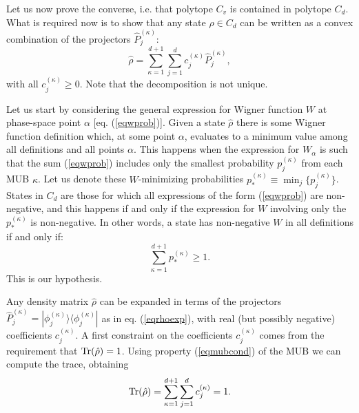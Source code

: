 \documentclass[aps,twocolumn,showpacs,nofootinbib,superscriptaddress]{revtex4}
\newcommand{\ket}[1]{|{#1}\rangle}
\newcommand{\bra}[1]{\langle{#1}|}
\begin{document}
Let us now prove the converse, i.e. that polytope $C_v$ is contained in polytope $C_d$. What is required now is to show that any state $\hat{\rho} \in C_d$ can be written as a convex combination of the projectors $\hat{P}_{j}^{(\kappa)}$:
\begin{equation}
\hat{\rho}=\sum_{\kappa=1}^{d+1} \sum_{j=1}^d
c_{j}^{(\kappa)}\hat{P}_{j}^{(\kappa)},\label{eqrhoexp}
\end{equation}
with all $c_{j}^{(\kappa)}\ge0$. Note that the decomposition is
not unique.

Let us start by considering the general expression for Wigner
function $W$ at phase-space point $\alpha$ [eq. (\ref{eqwprob})].
Given a state $\hat{\rho}$ there is some Wigner function
definition which, at some point $\alpha$, evaluates to a minimum
value among all definitions and all points $\alpha$. This happens
when the expression for $W_{\alpha}$ is such that the sum
(\ref{eqwprob}) includes only the smallest probability
$p_{j}^{(\kappa)}$ from each MUB $\kappa$. Let us denote these
$W$-minimizing probabilities $p_{*}^{(\kappa)}\equiv
\min_j\{p_{j}^{(\kappa)}\}$. States in $C_d$ are those for which
all expressions of the form (\ref{eqwprob}) are non-negative, and
this happens if and only if the expression for $W$ involving only
the $p_{*}^{(\kappa)}$ is non-negative. In other words, a state
has non-negative $W$ in all definitions if and only if:
\begin{equation}
\sum_{\kappa=1}^{d+1}p_{*}^{(\kappa)}\ge 1.
\end{equation}
This is our hypothesis.

Any density matrix $\hat{\rho}$ can be expanded in terms of the projectors
$\hat{P}_{j}^{(\kappa)}=\ket{\phi_{j}^{(\kappa)}} \bra{\phi_{j}^{(\kappa)}}$ as in eq.
(\ref{eqrhoexp}), with real (but possibly negative) coefficients
$c_{j}^{(\kappa)}$. A first constraint on the coefficients
$c_{j}^{(\kappa)}$ comes from the requirement that
${\rm Tr}(\hat{\rho})=1$. Using property (\ref{eqmubcond}) of the MUB we
can compute the trace, obtaining
\begin{equation}
{\rm Tr}(\hat{\rho})=\sum_{\kappa=1}^{d+1}\sum_{j=1}^d
c_{j}^{(\kappa)}=1.
\label{eqtr1cond}
\end{equation}
\end{document}
